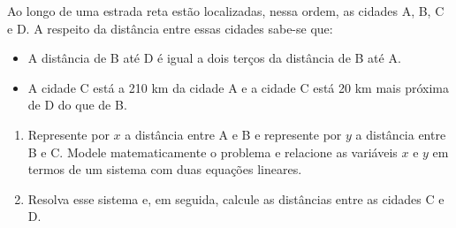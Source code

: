 \begin{problem}
Ao longo de uma estrada reta estão localizadas, nessa ordem, as cidades A, B, C e D. A respeito da distância entre essas cidades sabe-se que:
\begin{itemize}
\item A distância de B até D é igual a dois terços da distância de B até A.
\item A cidade C está a 210 km da cidade A e a cidade C está 20 km mais próxima de D do que de B.
\end{itemize}

\begin{enumerate} 
\item[(a)] Represente por $x$ a distância entre A e B e represente por $y$ a distância entre B e C. Modele matematicamente o problema e relacione as variáveis $x$ e $y$ em termos de um sistema com duas equações lineares.
\item[(b)] Resolva esse sistema e, em seguida, calcule as distâncias entre as cidades C e D.
\end{enumerate}
\end{problem}
